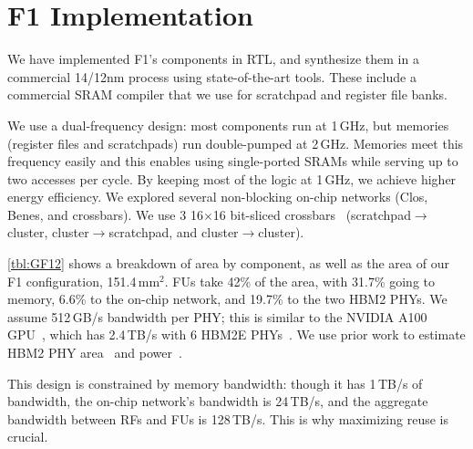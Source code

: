 \section{F1 Implementation}
\label{sec:implementation}

We have implemented F1's components in RTL,
and synthesize them in a commercial 14/12nm process using state-of-the-art tools.
These include a commercial SRAM compiler that we use for scratchpad and register file banks.

We use a dual-frequency design: most components run at 1\,GHz,
but memories (register files and scratchpads)
run double-pumped at 2\,GHz.
Memories meet this frequency easily and this enables using single-ported SRAMs while serving up to two accesses per cycle.
%
By keeping most of the logic at 1\,GHz, we achieve higher energy efficiency.
%
We explored several non-blocking on-chip networks (Clos, Benes, and crossbars).
We use 3 16$\times$16 bit-sliced crossbars~\cite{passas:tocaid12:crossbar} (scratch\-pad$\rightarrow$cluster, cluster$\rightarrow$scratchpad, and cluster$\rightarrow$cluster). %

\autoref{tbl:GF12} shows a breakdown of area by component, as well as the area of our F1 configuration,
151.4\,mm$^2$.
FUs take 42\% of the area, with 31.7\% going to memory,
6.6\% to the on-chip network, and 19.7\% to the two HBM2 PHYs.
We assume 512\,GB/s bandwidth per PHY;
this is similar to the NVIDIA A100 GPU~\cite{choquette2021nvidia}, which has 2.4\,TB/s with 6 HBM2E PHYs~\cite{nvidiadgx}.
We use prior work to estimate HBM2 PHY area~\cite{rambuswhite, dasgupta20208} and power~\cite{rambuswhite, ge2011design}.

This design is constrained by memory bandwidth: though it has 1\,TB/s of bandwidth,
the on-chip network's bandwidth is 24\,TB/s, and the aggregate bandwidth between RFs and FUs is 128\,TB/s.
This is why maximizing reuse is crucial.

